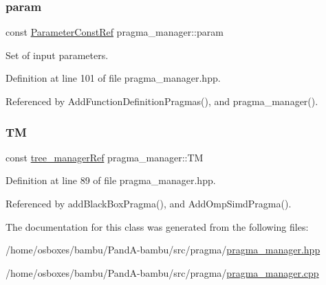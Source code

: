 \mbox{\label{classpragma__manager_ae835ae679a5824acb0d3462dccbdc9f3}} 
\subsubsection{\texorpdfstring{param}{param}}
{\footnotesize\ttfamily const \hyperlink{Parameter_8hpp_a37841774a6fcb479b597fdf8955eb4ea}{Parameter\+Const\+Ref} pragma\+\_\+manager\+::param\hspace{0.3cm}{\ttfamily [protected]}}



Set of input parameters. 



Definition at line 101 of file pragma\+\_\+manager.\+hpp.



Referenced by Add\+Function\+Definition\+Pragmas(), and pragma\+\_\+manager().

\mbox{\label{classpragma__manager_a9109662b40c1a68d1b9755a5170f1a01}} 
\subsubsection{\texorpdfstring{TM}{TM}}
{\footnotesize\ttfamily const \hyperlink{tree__manager_8hpp_a96ff150c071ce11a9a7a1e40590f205e}{tree\+\_\+manager\+Ref} pragma\+\_\+manager\+::\+TM\hspace{0.3cm}{\ttfamily [protected]}}



Definition at line 89 of file pragma\+\_\+manager.\+hpp.



Referenced by add\+Black\+Box\+Pragma(), and Add\+Omp\+Simd\+Pragma().



The documentation for this class was generated from the following files\+:\begin{DoxyCompactItemize}
\item 
/home/osboxes/bambu/\+Pand\+A-\/bambu/src/pragma/\hyperlink{pragma__manager_8hpp}{pragma\+\_\+manager.\+hpp}\item 
/home/osboxes/bambu/\+Pand\+A-\/bambu/src/pragma/\hyperlink{pragma__manager_8cpp}{pragma\+\_\+manager.\+cpp}\end{DoxyCompactItemize}
